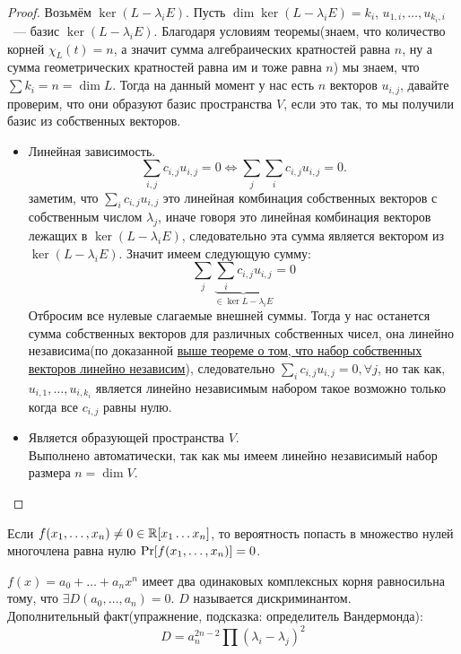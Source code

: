 \begin{proof}
    Возьмём $\ker(L - \lambda_i E)$. Пусть $\dim \ker (L - \lambda_i E) = k_i$, $u_{1,i},\dots,u_{k_i,i}$~--- базис $\ker(L - \lambda_i E)$. 
    Благодаря условиям теоремы(знаем, что количество корней
    $\chi_L(t) = n$, а значит сумма алгебраических кратностей равна $n$, ну а сумма 
    геометрических кратностей равна им и тоже равна $n$) мы знаем, что $\sum k_i = n = \dim L$.
    Тогда на данный момент у нас есть $n$ векторов $u_{i,j}$, давайте проверим, что они
    образуют базис пространства $V$, если это так, то мы получили базис из собственных
    векторов.
    \begin{itemize}
        \item Линейная зависимость.\\
        \[
                \sum\limits_{i,j}c_{i,j}u_{i,j} = 0 \Leftrightarrow
                \sum\limits_{j}\sum\limits_{i}c_{i,j}u_{i,j} = 0
        .\] 
        заметим, что $\sum\limits_{i}c_{i,j}u_{i,j}$
        это линейная комбинация собственных векторов с собственным числом $\lambda_j$,
        иначе говоря это линейная комбинация векторов лежащих в $\ker (L - \lambda_i E)$,
        следовательно эта сумма является вектором из $\ker (L - \lambda_i E)$.
        Значит имеем следующую сумму:
        \[
            \sum\limits_{j}\underbrace{\sum\limits_{i}c_{i,j}u_{i,j}}_{\in \ker L - \lambda_i E} = 0
        \] 
        Отбросим все нулевые слагаемые внешней суммы.
        Тогда у нас останется сумма собственных векторов для различных собственных чисел,
        она линейно независима(по доказанной \hyperref[thm:О линейной независимости набора собственных векторов]
        {выше теореме о том, что набор собственных векторов линейно независим}),
        следовательно $\sum\limits_{i}^{}{c_{i,j} u_{i,j}} = 0, \forall j$,
        но так как, $u_{i,1},\dots, u_{i, k_i}$ является линейно независимым
        набором такое возможно только когда все $c_{i,j}$ равны нулю.
        \item Является образующей пространства $V$.\\
            Выполнено автоматически, так как мы имеем линейно независимый набор
            размера $n = \dim V$.
    \end{itemize}
\end{proof}
\begin{remark}
    Если $f(x_1,\dots, x_n)\not= 0\in \mathbb{R}[x_1\dots x_n]$, то вероятность попасть в множество нулей многочлена равна нулю
    $\operatorname{Pr} [f(x_1,\dots, x_n)] = 0$.
\end{remark}
\begin{remark}
    $f(x) = a_0 + \dots + a_nx^n$ имеет два одинаковых комплексных корня равносильна тому, что 
     $\exists D(a_0,\dots, a_n) = 0$. $D$ называется дискриминантом. \\
     Дополнительный факт(упражнение, подсказка: определитель Вандермонда):
     \[
         D = a_n^{2n - 2}\prod\limits_{}^{}{(\lambda_i - \lambda_j)^2}
     \]
\end{remark}
